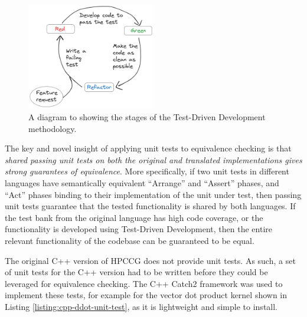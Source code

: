 \begin{figure}[H]
    \centering
    \includegraphics[width=0.5\textwidth]{images/3_translation/excalidraw_tdd.png}
    \caption{A diagram to showing the stages of the Test-Driven Development methodology.}
    \label{fig:excalidraw_tdd}
\end{figure}

The key and novel insight of applying unit tests to equivalence checking is that \textit{shared passing unit tests on both the original and translated implementations gives strong guarantees of equivalence}. More specifically, if two unit tests in different languages have semantically equivalent ``Arrange'' and ``Assert'' phases, and ``Act'' phases binding to their implementation of the unit under test, then passing unit tests guarantee that the tested functionality is shared by both languages. If the test bank from the original language has high code coverage, or the functionality is developed using Test-Driven Development, then the entire relevant functionality of the codebase can be guaranteed to be equal.


The original C++ version of HPCCG does not provide unit tests. As such, a set of unit tests for the C++ version had to be written before they could be leveraged for equivalence checking. The C++ Catch2 \cite{CatchorgCatch22024} framework was used to implement these tests, for example for the vector dot product kernel shown in Listing \ref{listing:cpp-ddot-unit-test}, as it is lightweight and simple to install.

